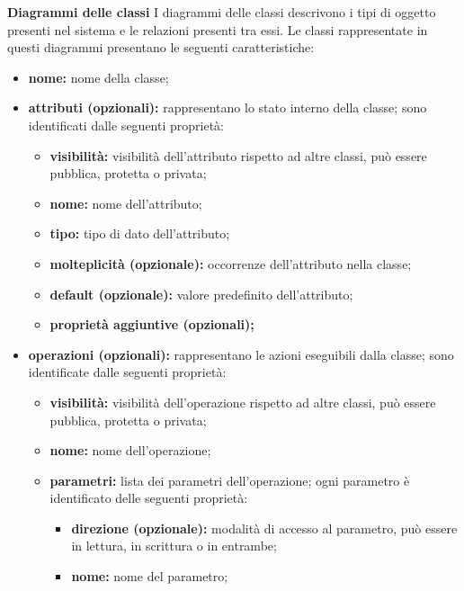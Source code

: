 						\textbf{Diagrammi delle classi}
						\newline
						\newline
						\hangindent=0.6cm I diagrammi delle classi descrivono i tipi di oggetto presenti nel sistema e le relazioni presenti tra essi.
						\newline
						\hangindent=0.6cm Le classi rappresentate in questi diagrammi presentano le seguenti caratteristiche:
						\begin{itemize}[leftmargin=1.5cm]
							\item \textbf{nome:} nome della classe;
							\item \textbf{attributi (opzionali):} rappresentano lo stato interno della classe; sono identificati dalle seguenti proprietà:
							\begin{itemize}
								\item \textbf{visibilità:} visibilità dell'attributo rispetto ad altre classi, può essere pubblica, protetta o privata;
								\item \textbf{nome:} nome dell'attributo;
								\item \textbf{tipo:} tipo di dato dell'attributo;
								\item \textbf{molteplicità (opzionale):} occorrenze dell'attributo nella classe;
								\item \textbf{default (opzionale):} valore predefinito dell'attributo;
								\item \textbf{proprietà aggiuntive (opzionali);}
							\end{itemize} 
							\item \textbf{operazioni (opzionali):} rappresentano le azioni eseguibili dalla classe; sono identificate dalle seguenti proprietà:
							\begin{itemize}
								\item \textbf{visibilità:} visibilità dell'operazione rispetto ad altre classi, può essere pubblica, protetta o privata;
								\item \textbf{nome:} nome dell'operazione;
								\item \textbf{parametri:} lista dei parametri dell'operazione; ogni parametro è identificato delle seguenti proprietà:
								\begin{itemize}
									\item \textbf{direzione (opzionale):} modalità di accesso al parametro, può essere in lettura, in scrittura o in entrambe;
									\item \textbf{nome:} nome del parametro;

\end{itemize}
\end{itemize}
\end{itemize}
